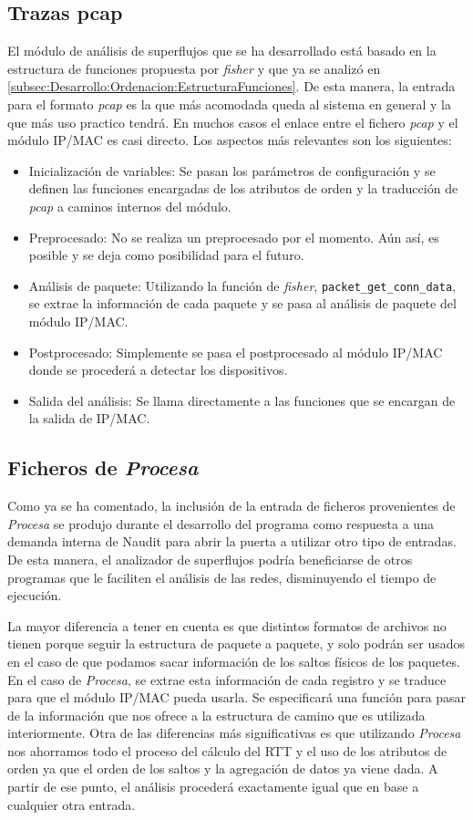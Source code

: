\documentclass[twoside, 12pt]{epstfg}
\begin{document}
\subsection{Trazas pcap}
El módulo de análisis de superflujos que se ha desarrollado está basado en la estructura de funciones propuesta por \textit{fisher} y que ya se analizó en \ref{subsec:Desarrollo:Ordenacion:EstructuraFunciones}. De esta manera, la entrada para el formato \textit{pcap} es la que más acomodada queda al sistema en general y la que más uso practico tendrá. En muchos casos el enlace entre el fichero \textit{pcap} y el módulo IP/MAC es casi directo. Los aspectos más relevantes son los siguientes:

\begin{itemize}
	\item{Inicialización de variables: }Se pasan los parámetros de configuración y se definen las funciones encargadas de los atributos de orden y la traducción de \textit{pcap} a caminos internos del módulo.
	\item{Preprocesado: }No se realiza un preprocesado por el momento. Aún así, es posible y se deja como posibilidad para el futuro.
	\item{Análisis de paquete: }Utilizando la función de \textit{fisher}, \texttt{packet\_get\_conn\_data}, se extrae la información de cada paquete y se pasa al análisis de paquete del módulo IP/MAC.
	\item{Postprocesado: }Simplemente se pasa el postprocesado al módulo IP/MAC donde se procederá a detectar los dispositivos.
	\item{Salida del análisis: }Se llama directamente a las funciones que se encargan de la salida de IP/MAC.
\end{itemize}

\subsection{Ficheros de \textit{Procesa}}
Como ya se ha comentado, la inclusión de la entrada de ficheros provenientes de \textit{Procesa} se produjo durante el desarrollo del programa como respuesta a una demanda interna de Naudit para abrir la puerta a utilizar otro tipo de entradas. De esta manera, el analizador de superflujos podría beneficiarse de otros programas que le faciliten el análisis de las redes, disminuyendo el tiempo de ejecución. 

La mayor diferencia a tener en cuenta es que distintos formatos de archivos no tienen porque seguir la estructura de paquete a paquete, y solo podrán ser usados en el caso de que podamos sacar información de los saltos físicos de los paquetes. En el caso de \textit{Procesa}, se extrae esta información de cada registro y se traduce para que el módulo IP/MAC pueda usarla. Se especificará una función para pasar de la información que nos ofrece a la estructura de camino que es utilizada interiormente. Otra de las diferencias más significativas es que utilizando \textit{Procesa} nos ahorramos todo el proceso del cálculo del RTT y el uso de los atributos de orden ya que el orden de los saltos y la agregación de datos ya viene dada. A partir de ese punto, el análisis procederá exactamente igual que en base a cualquier otra entrada.
\end{document}
